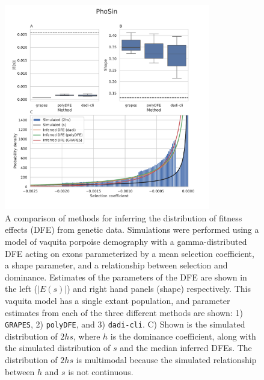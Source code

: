 \documentclass[hidelinks]{article}
\newcommand{\polydfe}{\texttt{polyDFE}\xspace}
\newcommand{\dadicli}{\texttt{dadi-cli}\xspace}
\newcommand{\grapes}{\texttt{GRAPES}\xspace}
\begin{document}
    \begin{figure}
        \centering
        \includegraphics[width=0.8\textwidth]{figures/PhoSin/Vaquita2Epoch_1R22/PhoSin_Vaquita2Epoch_1R22_Gamma_R22_Phocoena_sinus.mPhoSin1.pri.110_exons_DFE_plot.pdf}
        \caption{
        \label{fig:vaquita-dfe}
        A comparison of methods for inferring the distribution of fitness effects (DFE) from genetic data.
        Simulations were performed using a model of vaquita porpoise demography \citep{robinson2022critically} with a gamma-distributed DFE
        acting on exons parameterized by a mean selection coefficient, a shape parameter, and a relationship between selection and dominance. Estimates of the 
        parameters of the DFE are shown in the left ($\lvert E(s) \rvert $) and right hand panels (shape) respectively.
        This vaquita model has a single extant population, and parameter estimates from each
        of the three different methods are shown: 1) \grapes \cite{galtier2016adaptive}, 2) \polydfe \citep{tataru2020polydfe},
        and 3) \dadicli \citep{Huang2023,kim2017inference}.
        C) Shown is the simulated distribution of $2 h s$, where $h$ is the dominance coefficient, along with the simulated distribution of $s$ and the median inferred DFEs. The distribution of $2 h s$ is multimodal because the simulated relationship between $h$ and $s$ is not continuous.
        }
    \end{figure}
    
\end{document}
